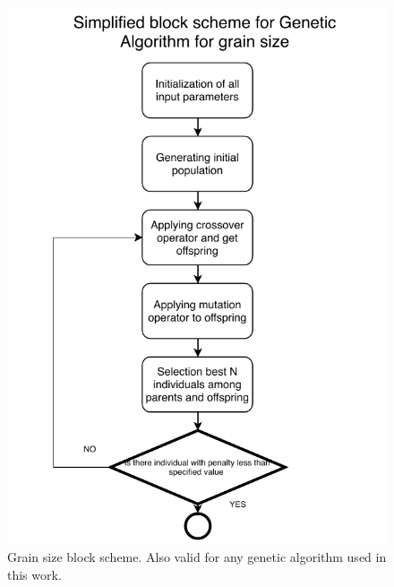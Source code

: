 \documentclass[12pt]{report}
\begin{document}
\begin{figure}
    \centering
    \includegraphics[width=5.0in]{grain_size_blockscheme}
    \caption{Grain size block scheme. Also valid for any genetic algorithm used in this work.}
    \label{grainsizeblock}
\end{figure}
\end{document}
